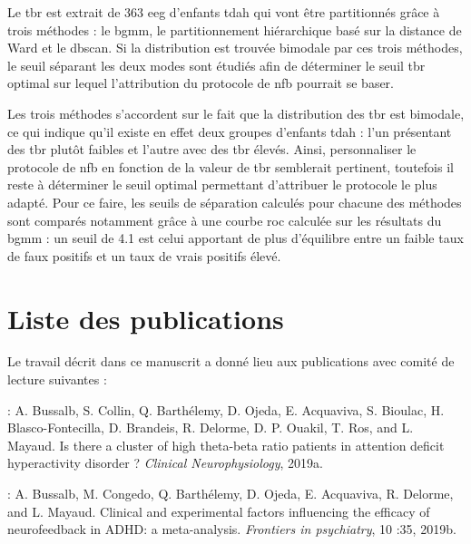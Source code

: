 Le \gls{tbr} est extrait de 363 \gls{eeg} d'enfants \gls{tdah} qui vont être partitionnés grâce à trois méthodes : le \gls{bgmm}, le partitionnement
hiérarchique basé sur la distance de Ward et le \gls{dbscan}. Si la distribution est trouvée bimodale par ces trois méthodes, le seuil séparant
les deux modes sont étudiés afin de déterminer le seuil \gls{tbr} optimal sur lequel l'attribution du protocole de \gls{nfb} pourrait se baser.

Les trois méthodes s'accordent sur le fait que la distribution des \gls{tbr} est bimodale, ce qui indique qu'il existe en effet deux groupes d'enfants
\gls{tdah} : l'un présentant des \gls{tbr} plutôt faibles et l'autre avec des \gls{tbr} élevés. Ainsi, personnaliser le protocole de \gls{nfb} en 
fonction de la valeur de \gls{tbr} semblerait pertinent, toutefois il reste à déterminer le seuil optimal permettant d'attribuer le protocole le plus
adapté. Pour ce faire, les seuils de séparation calculés pour chacune des méthodes sont comparés notamment grâce à une courbe \gls{roc} calculée sur
les résultats du \gls{bgmm} : un seuil de 4.1 est celui apportant de plus d'équilibre entre un faible taux de faux positifs et un taux de vrais positifs 
élevé.  



%
%

\section{Liste des publications}

Le travail décrit dans ce manuscrit a donné lieu aux publications avec comité de lecture suivantes :

\begin{description}
\item \citet{Bussalb2019tbr} : A. Bussalb, S. Collin, Q. Barthélemy, D. Ojeda, E. Acquaviva, S. Bioulac, H. Blasco-Fontecilla,
D. Brandeis, R. Delorme, D. P. Ouakil, T. Ros, and L. Mayaud. Is there a cluster of high
theta-beta ratio patients in attention deficit hyperactivity disorder ? \textit{Clinical Neurophysiology}, 2019a.
\item \citet{Bussalb2019clinical} : A. Bussalb, M. Congedo, Q. Barthélemy, D. Ojeda, E. Acquaviva, R. Delorme,
and L. Mayaud. Clinical and experimental factors influencing the efficacy of
neurofeedback in ADHD: a meta-analysis. \textit{Frontiers in psychiatry}, 10 :35, 2019b.
\end{description}

